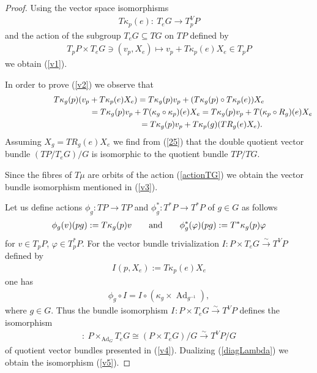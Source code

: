 \documentclass[pdftex]{sigma}
\renewcommand{\to}{\rightarrow}
\DeclareMathOperator{\Ad}{Ad}
\numberwithin{equation}{section}
\begin{document}
\begin{proof}Using the vector space isomorphisms \begin{gather*}
T\kappa_p(e)\colon \ T_eG\to T^V_pP \end{gather*}
and the action of the subgroup $T_eG\subseteq TG$ on $TP$ def\/ined by
\begin{gather*}
T_pP\times T_eG\ni(v_p,X_e)\mapsto v_p+T\kappa_p(e)X_e \in T_pP
\end{gather*}
we obtain (\ref{v1}).

In order to prove (\ref{v2}) we observe that
\begin{gather}
T\kappa_g(p)(v_p+T\kappa_p(e)X_e)
=T\kappa_g(p)v_p+(T\kappa_g(p)\circ T\kappa_p(e))X_e\nonumber\\
\hphantom{T\kappa_g(p)(v_p+T\kappa_p(e)X_e)}{} =T\kappa_g(p)v_p+T(\kappa_g\circ \kappa_p)(e)X_e
=T\kappa_g(p)v_p+T(\kappa_p\circ R_g)(e)X_e\nonumber\\
\hphantom{T\kappa_g(p)(v_p+T\kappa_p(e)X_e)}{} =T\kappa_g(p)v_p+T\kappa_p(g)(TR_g(e)X_e).\label{25}
\end{gather}
Assuming $X_g\!=\!TR_g(e)X_e$ we f\/ind from (\ref{25}) that the double quotient vector bundle $(TP/T_eG)\!/\!G$ is isomorphic to the quotient bundle $TP/TG$.

Since the f\/ibres of $T\mu$ are orbits of the action (\ref{actionTG}) we obtain the vector bundle isomorphism mentioned in (\ref{v3}).

Let us def\/ine actions $\phi_g\colon TP\to TP$ and $\phi_g^*\colon T^*P\to T^*P$ of $g\in G$ as follows
\begin{gather}\label{Phi}
\phi_g(v)(pg):=T\kappa_g(p)v \qquad {\rm and}\qquad \phi^*_g(\varphi)(pg):=T^*\kappa_g(p)\varphi
\end{gather}
for $ v\in T_pP$, $\varphi\in T^*_pP$. For the vector bundle trivialization $I\colon P\times T_eG\stackrel{\sim}{\longrightarrow} T^V P$ def\/ined by
\begin{gather}\label{Lambda}
I_{}(p,X_e):=T\kappa_p(e)X_e
\end{gather}
one has
\begin{gather}\label{diagLambda}
\phi_g\circ I = I\circ (\kappa_g\times \Ad_{g^{-1}}),
\end{gather}
where $g\in G$. Thus the bundle isomorphism $I_{}\colon P\times T_eG\stackrel{\sim}{\longrightarrow}T^VP$ def\/ines the isomorphism
\begin{gather*}[I]\colon \ P\times_{\Ad_G}T_eG\cong(P\times T_eG)/G\stackrel{\sim}{\longrightarrow}T^VP/G\end{gather*}
of quotient vector bundles presented in (\ref{v4}). Dualizing (\ref{diagLambda}) we obtain
the isomor\-phism (\ref{v5}).
\end{proof}
\end{document}
